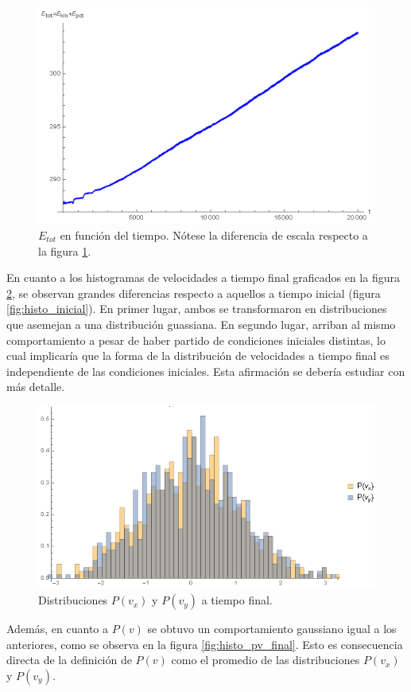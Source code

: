 \documentclass[aps,prb,twocolumn,superscriptaddress,floatfix,longbibliography]{revtex4-2}
\newif\ifptitle
\newif\ifpnumber
\newcounter{para}
\newcommand\ptitle[1]{\par\refstepcounter{para}
{\ifpnumber{\noindent\textcolor{lightgray}{\textbf{\thepara}}\indent}\fi}
{\ifptitle{\textbf{[{#1}]}}\fi}}
\begin{document}
\begin{figure}[h]
    \includegraphics[clip=true,width=0.75\columnwidth]{energia_tot.png}
    \caption{$E_{tot}$ en función del tiempo. Nótese la diferencia de escala respecto a la figura \ref{fig:energia_tot}.}
     \label{fig:energia_tot}
\end{figure}


\ptitle{Distribuciones de velocidades}
En cuanto a los histogramas de velocidades a tiempo final graficados en la figura \ref{fig:histo_final}, se observan grandes diferencias respecto a aquellos a tiempo inicial (figura \ref{fig:histo_inicial}). En primer lugar, ambos se transformaron en distribuciones que asemejan a una distribución guassiana. En segundo lugar, arriban al mismo comportamiento a pesar de haber partido de condiciones iniciales distintas, lo cual implicaría que la forma de la distribución de velocidades a tiempo final es independiente de las condiciones iniciales. Esta afirmación se debería estudiar con más detalle.

\begin{figure}[h]
    \includegraphics[clip=true,width=0.75\columnwidth]{histo_final.png}
    \caption{Distribuciones $P(v_x)$ y $P(v_y)$ a tiempo final.}
     \label{fig:histo_final}
\end{figure}

Además, en cuanto a $P(v)$ se obtuvo un comportamiento gaussiano igual a los anteriores, como se observa en la figura \ref{fig:histo_pv_final}. Esto es consecuencia directa de la definición de $P(v)$ como el promedio de las distribuciones $P(v_x)$ y $P(v_y)$.
\end{document}

